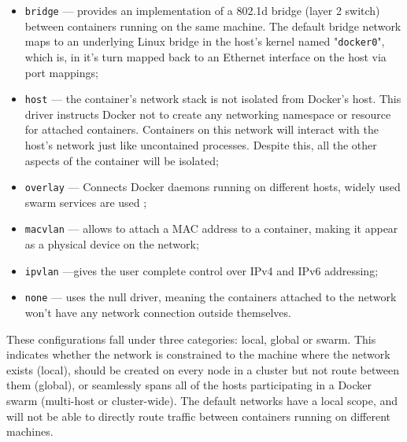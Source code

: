\begin{itemize}
    \item \texttt{bridge} --- provides an implementation of a 802.1d bridge (layer 2 switch) between containers running on the same machine. The default bridge network maps to an underlying Linux bridge in the host's kernel named "\texttt{docker0}", which is, in it's turn mapped back to an Ethernet interface on the host via port mappings\cite{network-bridge};
    \item \texttt{host} --- the container's network stack is not isolated from Docker's host. This driver instructs Docker not to create any networking namespace or resource for attached containers. Containers on this network will interact with the host's network just like uncontained processes. Despite this, all the other aspects of the container will be isolated\cite{network-host};
    \item \texttt{overlay} --- Connects Docker daemons running on different hosts, widely used swarm services are used \cite{network-overlay};
    \item \texttt{macvlan} --- allows to attach a \acs{MAC} address to a container, making it appear as a physical device on the network\cite{network-mac};
    \item \texttt{ipvlan} ---gives the user complete control over IPv4 and IPv6 addressing\cite{network-ipvlan};
    \item \texttt{none} --- uses the null driver, meaning the containers attached to the network won't have any network connection outside themselves.
\end{itemize}

These configurations fall under three categories: local, global or swarm. This indicates whether the network is constrained to the machine where the network exists (local), should be created on every node in a cluster but not route between them (global), or seamlessly spans all of the hosts participating in a Docker swarm (multi-host or cluster-wide)\cite{Poulton2020-ju}. The default networks have a local scope, and will not be able to directly route traffic between containers running on different machines\cite{network-drivers}.
